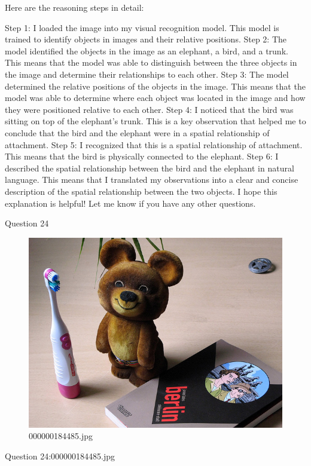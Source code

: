 \begin{enumerate}
        Here are the reasoning steps in detail:
        
        Step 1: I loaded the image into my visual recognition model. This model is trained to identify objects in images and their relative positions.
        Step 2: The model identified the objects in the image as an elephant, a bird, and a trunk. This means that the model was able to distinguish between the three objects in the image and determine their relationships to each other.
        Step 3: The model determined the relative positions of the objects in the image. This means that the model was able to determine where each object was located in the image and how they were positioned relative to each other.
        Step 4: I noticed that the bird was sitting on top of the elephant's trunk. This is a key observation that helped me to conclude that the bird and the elephant were in a spatial relationship of attachment.
        Step 5: I recognized that this is a spatial relationship of attachment. This means that the bird is physically connected to the elephant.
        Step 6: I described the spatial relationship between the bird and the elephant in natural language. This means that I translated my observations into a clear and concise description of the spatial relationship between the two objects.
        I hope this explanation is helpful! Let me know if you have any other questions.
    \end{enumerate}
Question 24
    \begin{figure}[h]
        \centering
        \includegraphics[width=0.8\linewidth]{../image set/easy/000000184485.jpg}
        \caption{000000184485.jpg}
    \end{figure}
    Question 24:000000184485.jpg
